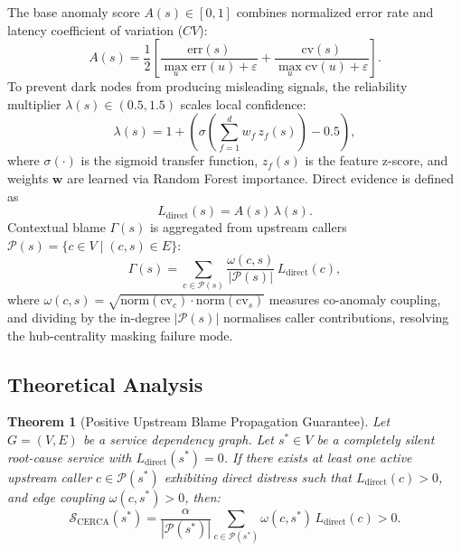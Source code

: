 \documentclass[conference]{IEEEtran}
\newtheorem{theorem}{Theorem}
\begin{document}
The base anomaly score $A(s)\in[0,1]$ combines normalized error rate and latency coefficient of variation ($CV$):
\begin{equation}
A(s)=\frac{1}{2}\left[\frac{\mathrm{err}(s)}{\max_{u}\mathrm{err}(u)+\varepsilon}+\frac{\mathrm{cv}(s)}{\max_{u}\mathrm{cv}(u)+\varepsilon}\right].
\end{equation}
To prevent dark nodes from producing misleading signals, the reliability multiplier $\lambda(s)\in(0.5,1.5)$ scales local confidence:
\begin{equation}
\lambda(s)=1+\left(\sigma\!\left(\sum_{f=1}^{d}w_f\,z_f(s)\right)-0.5\right),
\label{eq:lambda}
\end{equation}
where $\sigma(\cdot)$ is the sigmoid transfer function, $z_f(s)$ is the feature z-score, and weights $\mathbf{w}$ are learned via Random Forest importance. Direct evidence is defined as
\begin{equation}
L_{\mathrm{direct}}(s)=A(s)\,\lambda(s).
\end{equation}
Contextual blame $\Gamma(s)$ is aggregated from upstream callers $\mathcal{P}(s)=\{c\in V\mid (c,s)\in E\}$:
\begin{equation}
\Gamma(s)=\sum_{c\in\mathcal{P}(s)}\frac{\omega(c,s)}{|\mathcal{P}(s)|}\,L_{\mathrm{direct}}(c),
\label{eq:gamma}
\end{equation}
where $\omega(c,s)=\sqrt{\mathrm{norm}(\mathrm{cv}_c)\cdot\mathrm{norm}(\mathrm{cv}_s)}$ measures co-anomaly coupling, and dividing by the in-degree $|\mathcal{P}(s)|$ normalises caller contributions, resolving the hub-centrality masking failure mode.

\subsection{Theoretical Analysis}

\begin{theorem}[Positive Upstream Blame Propagation Guarantee]
Let $G=(V,E)$ be a service dependency graph. Let $s^*\in V$ be a completely silent root-cause service with $L_{\mathrm{direct}}(s^*)=0$. If there exists at least one active upstream caller $c\in\mathcal{P}(s^*)$ exhibiting direct distress such that $L_{\mathrm{direct}}(c)>0$, and edge coupling $\omega(c,s^*)>0$, then:
\begin{equation}
\mathcal{S}_{\mathrm{CERCA}}(s^*)=\frac{\alpha}{|\mathcal{P}(s^*)|}\sum_{c\in\mathcal{P}(s^*)}\omega(c,s^*)\,L_{\mathrm{direct}}(c)>0.
\end{equation}
\end{theorem}
\end{document}
